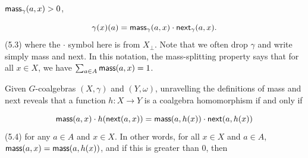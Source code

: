 \hypertarget{html:S5.SS0.SSS0.Px1.p5.m11}{}\({\mbox{\sf mass}_{\gamma}(a,x)>0}\),
\par\medskip
\hypertarget{html:S5.E3}{}   %
\hypertarget{html:S5.E3.m1}{}\[\gamma(x)(a)=\mbox{\sf mass}_{\gamma}(a,x)\cdot\mbox{\sf next}_{\gamma}(a,x).\]  (5.3)   where the %
\hypertarget{html:S5.SS0.SSS0.Px1.p5.m12}{}\({\cdot}\) symbol here is from %
\hypertarget{html:S5.SS0.SSS0.Px1.p5.m13}{}\({X_{\bot}}\). Note that we often drop %
\hypertarget{html:S5.SS0.SSS0.Px1.p5.m14}{}\({\gamma}\) and write simply mass and next. In this notation, the mass-splitting property says that for all %
\hypertarget{html:S5.SS0.SSS0.Px1.p5.m17}{}\({x\in X}\), we have %
\hypertarget{html:S5.SS0.SSS0.Px1.p5.m18}{}\({\sum_{a\in A}\mbox{\sf mass}(a,x)=1}\).
\par\medskip
\hypertarget{html:S5.SS0.SSS0.Px1.p6}{} Given %
\hypertarget{html:S5.SS0.SSS0.Px1.p6.m1}{}\({G}\)-coalgebras %
\hypertarget{html:S5.SS0.SSS0.Px1.p6.m2}{}\({(X,\gamma)}\) and %
\hypertarget{html:S5.SS0.SSS0.Px1.p6.m3}{}\({(Y,\omega)}\), unravelling the definitions of mass and next reveals that a function %
\hypertarget{html:S5.SS0.SSS0.Px1.p6.m6}{}\({h:X\to Y}\) is a coalgebra homomorphism if and only if
\par\medskip
\hypertarget{html:S5.E4}{}   %
\hypertarget{html:S5.E4.m1}{}\[\mbox{\sf mass}(a,x)\cdot h(\mbox{\sf next}(a,x))=\mbox{\sf mass}(a,h(x))\cdot\mbox{\sf next}(a,h(x))\]  (5.4)   for any %
\hypertarget{html:S5.SS0.SSS0.Px1.p6.m7}{}\({a\in A}\) and %
\hypertarget{html:S5.SS0.SSS0.Px1.p6.m8}{}\({x\in X}\). In other words, for all %
\hypertarget{html:S5.SS0.SSS0.Px1.p6.m9}{}\({x\in X}\) and %
\hypertarget{html:S5.SS0.SSS0.Px1.p6.m10}{}\({a\in A}\), %
\hypertarget{html:S5.SS0.SSS0.Px1.p6.m11}{}\({\mbox{\sf mass}(a,x)=\mbox{\sf mass}(a,h(x))}\), and if this is greater than %
\hypertarget{html:S5.SS0.SSS0.Px1.p6.m12}{}\({0}\), then %
